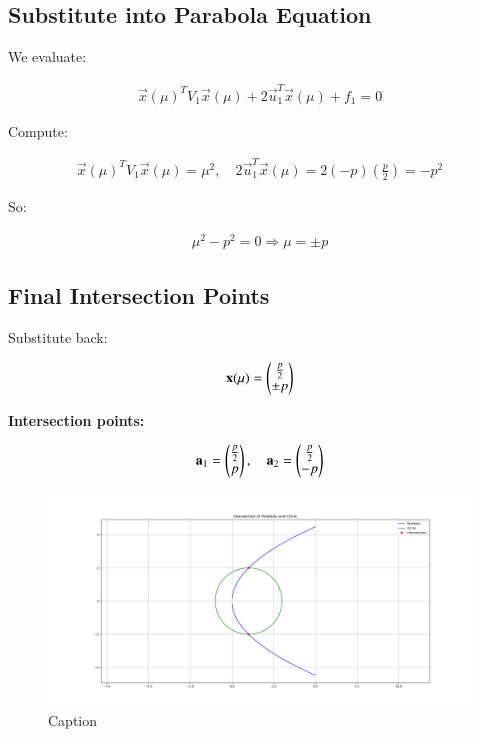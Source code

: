 \documentclass{article}
\begin{document}
\subsection*{Substitute into Parabola Equation}

We evaluate:


\begin{align}
\vec{x}(\mu)^T V_1 \vec{x}(\mu) + 2 \vec{u}_1^T \vec{x}(\mu) + f_1 = 0
\end{align}



Compute:


\begin{align}
\vec{x}(\mu)^T V_1 \vec{x}(\mu) = \mu^2, \quad
2 \vec{u}_1^T \vec{x}(\mu) = 2(-p)(\frac{p}{2}) = -p^2
\end{align}



So:


\begin{align}
\mu^2 - p^2 = 0 \Rightarrow \mu = \pm p
\end{align}



\subsection*{Final Intersection Points}

Substitute back:


\begin{align}
\mathbf{x}(\mu) = \begin{pmatrix}\frac{p}{2} \\ \pm p\end{pmatrix}
\end{align}



\textbf{Intersection points:}


\begin{align}
\mathbf{a}_1 = \begin{pmatrix}\frac{p}{2} \\ p\end{pmatrix}, \quad
\mathbf{a}_2 = \begin{pmatrix}\frac{p}{2} \\ -p\end{pmatrix}
\end{align}




\begin{figure}[H]
    \centering
    \includegraphics[width=0.8\linewidth]{./figs/Figure_1.png}
    \caption{Caption}
    \label{fig:placeholder}
\end{figure}
\end{document}
